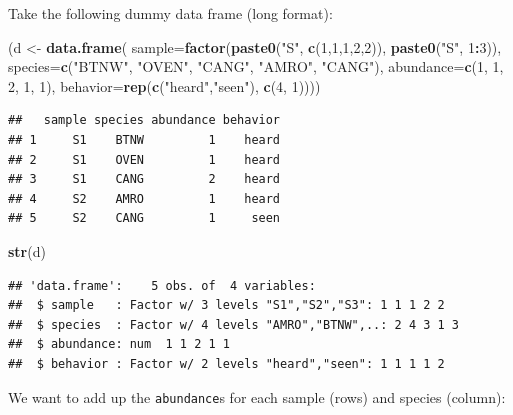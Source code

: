 \documentclass[12pt,]{book}
\newenvironment{Shaded}{\begin{snugshade}}{\end{snugshade}}
\newcommand{\DataTypeTok}[1]{\textcolor[rgb]{0.13,0.29,0.53}{#1}}
\newcommand{\DecValTok}[1]{\textcolor[rgb]{0.00,0.00,0.81}{#1}}
\newcommand{\KeywordTok}[1]{\textcolor[rgb]{0.13,0.29,0.53}{\textbf{#1}}}
\newcommand{\NormalTok}[1]{#1}
\newcommand{\OperatorTok}[1]{\textcolor[rgb]{0.81,0.36,0.00}{\textbf{#1}}}
\newcommand{\StringTok}[1]{\textcolor[rgb]{0.31,0.60,0.02}{#1}}
\begin{document}
Take the following dummy data frame (long format):

\begin{Shaded}
\begin{Highlighting}[]
\NormalTok{(d <-}\StringTok{ }\KeywordTok{data.frame}\NormalTok{(}
  \DataTypeTok{sample=}\KeywordTok{factor}\NormalTok{(}\KeywordTok{paste0}\NormalTok{(}\StringTok{"S"}\NormalTok{, }\KeywordTok{c}\NormalTok{(}\DecValTok{1}\NormalTok{,}\DecValTok{1}\NormalTok{,}\DecValTok{1}\NormalTok{,}\DecValTok{2}\NormalTok{,}\DecValTok{2}\NormalTok{)), }\KeywordTok{paste0}\NormalTok{(}\StringTok{"S"}\NormalTok{, }\DecValTok{1}\OperatorTok{:}\DecValTok{3}\NormalTok{)),}
  \DataTypeTok{species=}\KeywordTok{c}\NormalTok{(}\StringTok{"BTNW"}\NormalTok{, }\StringTok{"OVEN"}\NormalTok{, }\StringTok{"CANG"}\NormalTok{, }\StringTok{"AMRO"}\NormalTok{, }\StringTok{"CANG"}\NormalTok{),}
  \DataTypeTok{abundance=}\KeywordTok{c}\NormalTok{(}\DecValTok{1}\NormalTok{, }\DecValTok{1}\NormalTok{, }\DecValTok{2}\NormalTok{, }\DecValTok{1}\NormalTok{, }\DecValTok{1}\NormalTok{),}
  \DataTypeTok{behavior=}\KeywordTok{rep}\NormalTok{(}\KeywordTok{c}\NormalTok{(}\StringTok{"heard"}\NormalTok{,}\StringTok{"seen"}\NormalTok{), }\KeywordTok{c}\NormalTok{(}\DecValTok{4}\NormalTok{, }\DecValTok{1}\NormalTok{))))}
\end{Highlighting}
\end{Shaded}

\begin{verbatim}
##   sample species abundance behavior
## 1     S1    BTNW         1    heard
## 2     S1    OVEN         1    heard
## 3     S1    CANG         2    heard
## 4     S2    AMRO         1    heard
## 5     S2    CANG         1     seen
\end{verbatim}

\begin{Shaded}
\begin{Highlighting}[]
\KeywordTok{str}\NormalTok{(d)}
\end{Highlighting}
\end{Shaded}

\begin{verbatim}
## 'data.frame':    5 obs. of  4 variables:
##  $ sample   : Factor w/ 3 levels "S1","S2","S3": 1 1 1 2 2
##  $ species  : Factor w/ 4 levels "AMRO","BTNW",..: 2 4 3 1 3
##  $ abundance: num  1 1 2 1 1
##  $ behavior : Factor w/ 2 levels "heard","seen": 1 1 1 1 2
\end{verbatim}

We want to add up the \texttt{abundance}s for each sample (rows) and species (column):
\end{document}
